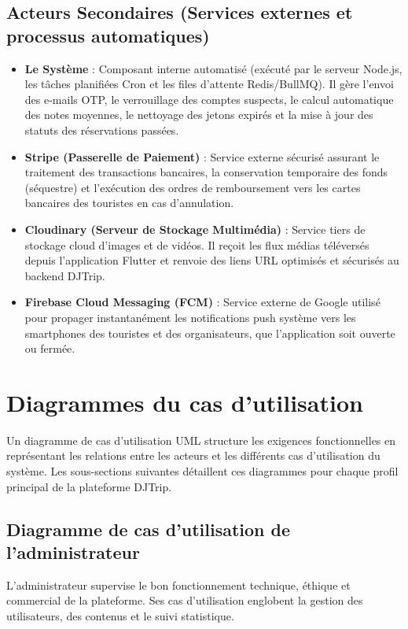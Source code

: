 \documentclass[12pt,a4paper]{report}
\begin{document}
\subsection{Acteurs Secondaires (Services externes et processus automatiques)}
\begin{itemize}[label=\textbullet]
    \item \textbf{Le Système} :
    Composant interne automatisé (exécuté par le serveur Node.js, les tâches planifiées Cron et les files d'attente Redis/BullMQ). Il gère l'envoi des e-mails OTP, le verrouillage des comptes suspects, le calcul automatique des notes moyennes, le nettoyage des jetons expirés et la mise à jour des statuts des réservations passées.

    \item \textbf{Stripe (Passerelle de Paiement)} :
    Service externe sécurisé assurant le traitement des transactions bancaires, la conservation temporaire des fonds (séquestre) et l'exécution des ordres de remboursement vers les cartes bancaires des touristes en cas d'annulation.

    \item \textbf{Cloudinary (Serveur de Stockage Multimédia)} :
    Service tiers de stockage cloud d'images et de vidéos. Il reçoit les flux médias téléversés depuis l'application Flutter et renvoie des liens URL optimisés et sécurisés au backend DJTrip.

    \item \textbf{Firebase Cloud Messaging (FCM)} :
    Service externe de Google utilisé pour propager instantanément les notifications push système vers les smartphones des touristes et des organisateurs, que l'application soit ouverte ou fermée.
\end{itemize}

\section{Diagrammes du cas d'utilisation}
Un diagramme de cas d'utilisation UML structure les exigences fonctionnelles en représentant les relations entre les acteurs et les différents cas d'utilisation du système. Les sous-sections suivantes détaillent ces diagrammes pour chaque profil principal de la plateforme DJTrip.

\subsection{Diagramme de cas d'utilisation de l'administrateur}
L'administrateur supervise le bon fonctionnement technique, éthique et commercial de la plateforme. Ses cas d'utilisation englobent la gestion des utilisateurs, des contenus et le suivi statistique.
\end{document}
